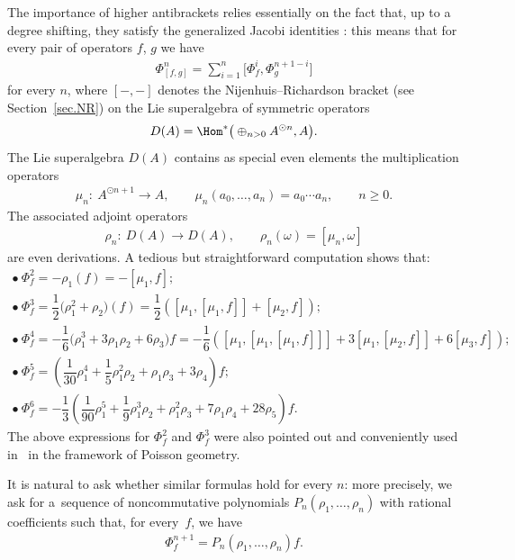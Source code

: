 The importance of higher antibrackets relies essentially on the fact that, up to a degree shifting, they satisfy the generalized Jacobi identities \cite{BDA,kravchenko2000}: this means that for every pair of operators
$f$, $g$ we have
\begin{gather*} \Phi^{n}_{[f,g]}=\sum_{i=1}^n\big[\Phi_f^i,\Phi_g^{n+1-i}\big]\end{gather*}
for every $n$, where $[-,-]$ denotes the Nijenhuis--Richardson bracket (see Section~\ref{sec.NR}) on the Lie superalgebra of symmetric operators
\begin{gather*}D(A)=\Hom^*\big(\oplus_{n>0}A^{\odot n},A\big) .\end{gather*}
The Lie superalgebra $D(A)$ contains as special even elements the multiplication operators
\begin{gather*} \mu_n\colon \ A^{\odot n+1}\to A,\qquad \mu_n(a_0,\ldots,a_n)=a_0\cdots a_n ,\qquad n\ge 0 .\end{gather*}
The associated adjoint operators
\begin{gather*} \rho_n\colon \ D(A)\to D(A),\qquad \rho_n(\omega)=[\mu_n,\omega]  \end{gather*}
are even derivations. A tedious but straightforward computation shows that:
\begin{gather*}
\bullet \ \Phi^2_f=-\rho_1(f)=-[\mu_1,f];\\
\bullet \ \Phi^3_f=\dfrac{1}{2}\big(\rho_1^2+\rho_2\big)(f)=\dfrac{1}{2}([\mu_1,[\mu_1,f]]+[\mu_2,f]);\\
\bullet \ \Phi^4_f=-\dfrac{1}{6}\big(\rho_1^3+3\rho_1\rho_2+6\rho_3\big)f=
-\dfrac{1}{6}([\mu_1,[\mu_1,[\mu_1,f]]]+3[\mu_1,[\mu_2,f]]+6[\mu_3,f]);\\
\bullet \ \Phi^5_f=\left(\dfrac{1}{30}\rho_1^4+\dfrac{1}{5}\rho_1^2\rho_2+\rho_1\rho_3+3\rho_4\right)f;\\
\bullet \ \Phi^6_f=-\dfrac{1}{3}\left(\dfrac{1}{90}\rho_1^5+\dfrac{1}{9}\rho_1^3\rho_2+\rho_1^2\rho_3+7\rho_1\rho_4+28\rho_5\right)f.
\end{gather*}
The above expressions for $\Phi^2_f$ and $\Phi^3_f$ were also pointed out and conveniently used in~\cite{FMpoisson} in the framework of Poisson geometry.

It is natural to ask whether similar formulas hold for every $n$: more precisely, we ask for a~sequence of noncommutative polynomials $P_n(\rho_1,\ldots,\rho_n)$ with rational coef\/f\/icients such that, for every~$f$, we have
\begin{gather}\label{equ.polinomigeneratori}
 \Phi_f^{n+1}=P_n(\rho_1,\ldots,\rho_n)f .
 \end{gather}
